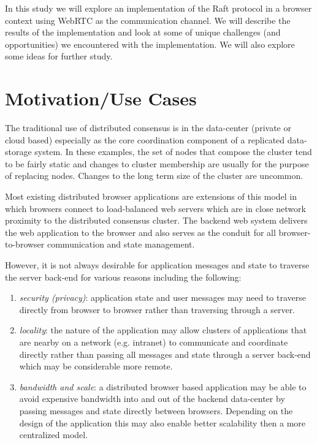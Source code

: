 \documentclass[9pt]{extarticle}
\begin{document}
\begin{multicols}{2}
In this study we will explore an implementation of the Raft protocol
in a browser context using WebRTC as the communication channel. We
will describe the results of the implementation and look at some of
unique challenges (and opportunities) we encountered with the
implementation. We will also explore some ideas for further study.

\section{Motivation/Use Cases}
The traditional use of distributed consensus is in the data-center
(private or cloud based) especially as the core coordination component
of a replicated data-storage system. In these examples, the set of
nodes that compose the cluster tend to be fairly static and changes to
cluster membership are usually for the purpose of replacing nodes.
Changes to the long term size of the cluster are uncommon.

Most existing distributed browser applications are extensions of this
model in which browsers connect to load-balanced web servers which are
in close network proximity to the distributed consensus cluster. The
backend web system delivers the web application to the browser and
also serves as the conduit for all browser-to-browser communication
and state management.

However, it is not always desirable for application messages and state
to traverse the server back-end for various reasons including the
following:

\begin{enumerate}
\item \emph{security (privacy)}: application state and user messages may need to traverse directly from browser to browser rather than traversing through a server.
\item \emph{locality}: the nature of the application may allow clusters of applications that are nearby on a network (e.g. intranet) to communicate and coordinate directly rather than passing all messages and state through a server back-end which may be considerable more remote.
\item \emph{bandwidth and scale}: a distributed browser based application may be able to avoid expensive bandwidth into and out of the backend data-center by passing messages and state directly between browsers.  Depending on the design of the application this may also enable better scalability then a more centralized model.
\end{enumerate}


\end{multicols}
\end{document}
